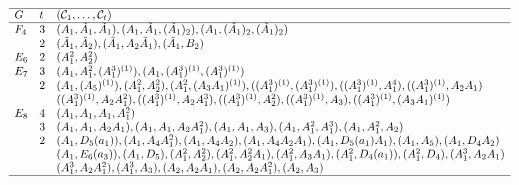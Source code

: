 \documentclass[twoside,a4paper,reqno,11pt]{amsart}
\newcommand{\<}{\langle}
\renewcommand{\>}{\rangle}
\renewcommand{\:}{\colon}
\theoremstyle{plain}
\theoremstyle{definition}
\begin{document}
{\small
\begin{table}[h]
\renewcommand{\thetable}{B}
\[
\begin{array}{lll} \hline
G & t & (\mathcal{C}_1, \ldots, \mathcal{C}_t) \\ \hline
F_4 & 3 & (A_1, \tilde{A}_1, \tilde{A}_1), (A_1, \tilde{A}_1, (\tilde{A}_1)_2), (A_1, (\tilde{A}_1)_2, (\tilde{A}_1)_2) \\
& 2 & (\tilde{A}_1,\tilde{A}_2), (\tilde{A}_1, A_2\tilde{A}_1), (\tilde{A}_1,B_2) \\
E_6 & 2 & (A_1^2,A_2^2) \\ 
E_7 & 3 & (A_1,A_1^2,(A_1^3)^{(1)}), (A_1,(A_1^3)^{(1)},(A_1^3)^{(1)}) \\
& 2 & (A_1,(A_5)^{(1)}), (A_1^2,A_2^2), (A_1^2,(A_3A_1)^{(1)}), ((A_1^3)^{(1)}, (A_1^3)^{(1)}), ((A_1^3)^{(1)},A_1^4), ((A_1^3)^{(1)},A_2A_1) \\
& &  ((A_1^3)^{(1)},A_2A_1^2), ((A_1^3)^{(1)},A_2A_1^3), ((A_1^3)^{(1)},A_2^2), ((A_1^3)^{(1)},A_3), ((A_1^3)^{(1)},(A_3A_1)^{(1)}) \\
E_8 & 4 & (A_1, A_1, A_1, A_1^2) \\  
& 3 & (A_1,A_1,A_2A_1), (A_1,A_1,A_2A_1^2), (A_1,A_1,A_3), (A_1,A_1^2,A_1^3), (A_1,A_1^2,A_2)  \\
& 2 & (A_1,D_5(a_1)), (A_1,A_4A_1^2), (A_1,A_4A_2), (A_1,A_4A_2A_1), (A_1,D_5(a_1)A_1), (A_1,A_5), (A_1,D_4A_2) \\
& &  (A_1,E_6(a_3)), (A_1,D_5), (A_1^2,A_2^2), (A_1^2,A_2^2A_1),(A_1^2,A_3A_1), (A_1^2,D_4(a_1)), (A_1^2,D_4), (A_1^3,A_2A_1) \\
& & (A_1^3,A_2A_1^2), (A_1^3,A_3), (A_2,A_2A_1), (A_2,A_2A_1^2), (A_2,A_3)  \\ \hline
\end{array}
\]
\caption{The varieties $X = \mathcal{C}_1 \times \cdots \times \mathcal{C}_t$ in Theorem \ref{t:main} with 
$\Delta = \emptyset$, Part II}
\label{tab:special}
\end{table}
}

\clearpage
\end{document}

